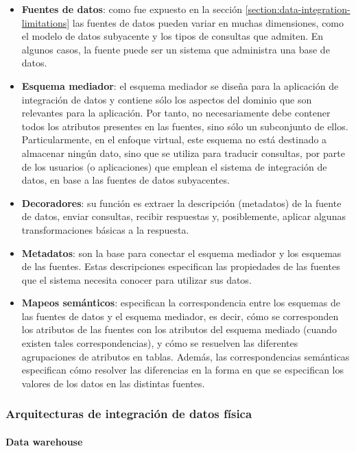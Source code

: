     \begin{itemize}
        \item \textbf{Fuentes de datos}: como fue expuesto en la sección \ref{section:data-integration-limitations} las fuentes de datos pueden variar en muchas dimensiones, como el modelo de datos subyacente y los tipos de consultas que admiten. 
        En algunos casos, la fuente puede ser un sistema que administra una base de datos.
        \item \textbf{Esquema mediador}: 
        el esquema mediador se diseña para la aplicación de integración de datos y contiene sólo los aspectos del dominio que son relevantes para la aplicación. 
        Por tanto, no necesariamente debe contener todos los atributos presentes en las fuentes, sino sólo un subconjunto de ellos. 
        Particularmente, en el enfoque virtual, este esquema no está destinado a almacenar ningún dato, sino que se utiliza para traducir consultas, por parte de los usuarios (o aplicaciones) que emplean el sistema de integración de datos, en base a las fuentes de datos subyacentes.
        \item \textbf{Decoradores}: su función es extraer la descripción (metadatos) de la fuente de datos, enviar consultas, recibir respuestas y, posiblemente, aplicar algunas transformaciones básicas a la respuesta.
        \item \textbf{Metadatos}: son la base para conectar el esquema mediador y los esquemas de las fuentes. Estas descripciones especifican las propiedades de las fuentes que el sistema necesita conocer para utilizar sus datos.
        \item \textbf{Mapeos semánticos}:  especifican la correspondencia entre los esquemas de las fuentes de datos y el esquema mediador, es decir, cómo se corresponden los atributos de las fuentes con los atributos del esquema mediado (cuando existen tales correspondencias), y cómo se resuelven las diferentes agrupaciones de atributos en tablas. 
        Además, las correspondencias semánticas especifican cómo resolver las diferencias en la forma en que se especifican los valores de los datos en las distintas fuentes.
    \end{itemize}

\subsubsection{Arquitecturas de integración de datos física}

    \paragraph{Data warehouse\newline}

